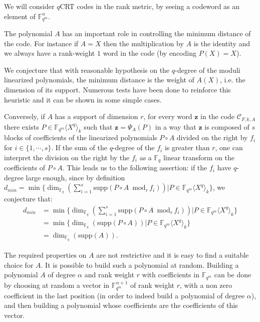 \documentclass{article}
\newcommand{\Fq}{\mathbb{F}_q}
\newcommand{\Fqm}{\mathbb{F}_{q^m}}
\newcommand{\QP}{\mathbb{F}_{q^m} \langle X^q \rangle}
\theoremstyle{definition}
\begin{document}
We will consider $q$CRT codes in the rank metric, by seeing a codeword as an element of $\Fqm^n$.
\color{black}

The polynomial $A$ has an important role in controlling the minimum distance of the code. For instance if $A=X$ then the multiplication by $A$ is the identity and we always have a rank-weight $1$ word in the code (by encoding $P(X)=X$).

We conjecture that with reasonable hypothesis on the $q$-degree of the moduli linearized polynomials, the minimum distance is the weight of $A(X)$, i.e. the dimension of its support. Numerous tests have been done to reinforce this heuristic and it can be shown in some simple cases.


Conversely, if $A$ has a support of dimension $r$, for every word $\mathbf{z}$ in the code $\mathcal{C}_{F,k,A}$ there exists $P \in \QP_k$ such that $\mathbf{z} = \Psi_A(P)$ in a way that $\mathbf{z}$ is composed of $s$ blocks of coefficients of the linearized polynomials $ P \circ A$ divided on the right by $f_i$ for $i \in \{1,\cdots,s\}$. If the sum of the $q$-degree of the $f_i$ is greater than $r$, one can interpret the division on the right by the $f_i$ as a $\Fq$ linear transform on the coefficients of $P \circ A$. This leads us to the following assertion:  if the $f_i$ have $q$-degree large enough, since by definition  $d_{min} = \min\{ \dim_{\Fq}( \sum_{i=1}^s \text{supp}(P \circ A \, \text{ mod}_r \, f_i)) | P \in \QP_k \}$, we conjecture that:
\begin{align*}
      d_{min} & =\min\{\dim_{\Fq}(\sum_{i=1}^s \text{supp}(P \circ A \, \text{ mod}_r \, f_i)) | P \in \QP_k\} \\& =  \min\{ \dim_{\Fq}(\text{supp}(P \circ A)) | P \in \QP_k \} \\&=\dim_{\Fq}(\text{supp}(A)).
\end{align*}
\color{black}


The required properties on $A$ are not restrictive and it is easy to find a suitable choice for $A$. It is possible to build such a polynomial at random. Building a polynomial $A$ of degree $\alpha$ and rank weight $r$  with coefficients in $\mathbb{F}_{q^m}$ can be done by choosing at random a vector in $\mathbb{F}_{q^m}^{\alpha+1}$ of rank weight $r$, with a non zero coefficient in the last position (in order to indeed build a polynomial of degree $\alpha$), and then building a polynomial whose coefficients are the coefficients of this vector.
\end{document}
